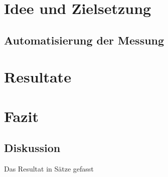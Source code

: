 \documentclass{../template/ffhsthesis}
\begin{document}
\chapter{Idee und Zielsetzung}






\section{Automatisierung der Messung}


\chapter{Resultate}
\chapter{Fazit}
\section{Diskussion}
Das Resultat in Sätze gefasst








\listoffigures
\end{document}
